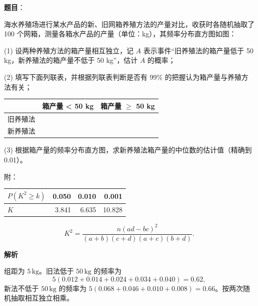 \begin{answer}

\textbf{题目}：

海水养殖场进行某水产品的新、旧网箱养殖方法的产量对比，收获时各随机抽取了 100 个网箱，测量各箱水产品的产量（单位：kg），其频率分布直方图如图：
\nopagebreak[4]
\begin{center}\end{center}
\nopagebreak[4]
   (1) 设两种养殖方法的箱产量相互独立，记 \(A\) 表示事件“旧养殖法的箱产量低于 50 kg，新养殖法的箱产量不低于 50 kg”，估计 \(A\) 的概率；

   (2) 填写下面列联表，并根据列联表判断是否有 99\% 的把握认为箱产量与养殖方法有关；

\begin{center}
\begin{tabular}{lrr}
\toprule
 & 箱产量 < 50 kg & 箱产量 $\geq$ 50 kg \\
\midrule
旧养殖法 &  &  \\
新养殖法 &  &  \\
\bottomrule
\end{tabular}
\end{center}

   (3) 根据箱产量的频率分布直方图，求新养殖法箱产量的中位数的估计值（精确到 0.01）。

   附：

\begin{center}
\begin{tabular}{lrrr}
\toprule
\(P(K^2\geq k)\) & 0.050 & 0.010 & 0.001 \\
\midrule
\(K\) & 3.841 & 6.635 & 10.828 \\
\bottomrule
\end{tabular}
\end{center}

\nopagebreak[4]
   \[
   K^2=\frac{n(ad-bc)^2}{(a+b)(c+d)(a+c)(b+d)}.
   \]


\textbf{解析}


组距为 \(5\,\mathrm{kg}\)。旧法低于 \(50\,\mathrm{kg}\) 的频率为
\nopagebreak[4]
\[
5(0.012+0.014+0.024+0.034+0.040)=0.62,
\]
新法不低于 \(50\,\mathrm{kg}\) 的频率为 \(5(0.068+0.046+0.010+0.008)=0.66\)。按两次随机抽取相互独立相乘。



\end{answer}
